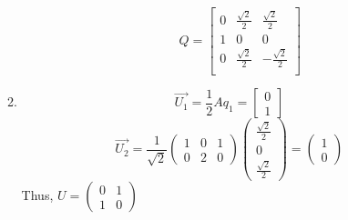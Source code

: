 \documentclass[11pt]{article} %
\begin{document}
\begin{enumerate}
\begin{enumerate}
\begin{itemize}
 $$Q=\begin{bmatrix}
 	0&	\frac{\sqrt{2}}{2}&	\frac{\sqrt{2}}{2}\\
 	1&0&0\\
 	0&	\frac{\sqrt{2}}{2}&-\frac{\sqrt{2}}{2}\\
 \end{bmatrix}$$
\end{itemize}
\item 
$$\vec{U_1}=\frac{1}{2}Aq_1=\begin{bmatrix}
	0\\1
\end{bmatrix}$$
$$\vec{U_2}=\frac{1}{\sqrt{2}}\begin{pmatrix}
	1&0&1\\0&2&0
\end{pmatrix}\begin{pmatrix}
	\frac{\sqrt{2}}{2}\\0\\	\frac{\sqrt{2}}{2}
\end{pmatrix}=\begin{pmatrix}
1\\0
\end{pmatrix}$$
Thus, $U=\begin{pmatrix}
	0&1\\1&0
\end{pmatrix}$
\end{enumerate}



\end{enumerate}
\end{document}
